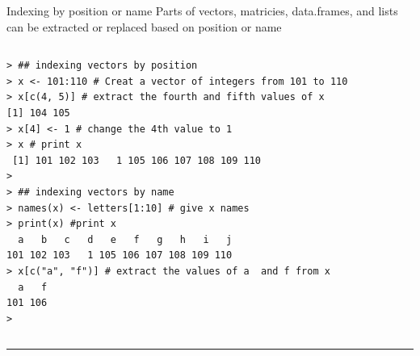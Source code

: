 \documentclass[table,smaller]{beamer}
\begin{document}
\begin{frame}[fragile,label=sec-3-1]{Indexing by position or name}
 Parts of vectors, matricies, data.frames, and lists can be extracted or replaced based on position or name
\vspace{-.5em}
\begin{columns}
\begin{block}{}
\begin{verbatim}
> ## indexing vectors by position
> x <- 101:110 # Creat a vector of integers from 101 to 110
> x[c(4, 5)] # extract the fourth and fifth values of x
[1] 104 105
> x[4] <- 1 # change the 4th value to 1
> x # print x
 [1] 101 102 103   1 105 106 107 108 109 110
> 
> ## indexing vectors by name
> names(x) <- letters[1:10] # give x names
> print(x) #print x
  a   b   c   d   e   f   g   h   i   j 
101 102 103   1 105 106 107 108 109 110 
> x[c("a", "f")] # extract the values of a  and f from x
  a   f 
101 106 
>
\end{verbatim}
\end{block}
\end{columns}
\vspace{.5em}

\rule{\linewidth}{0.5pt}
\end{frame}
\end{document}

